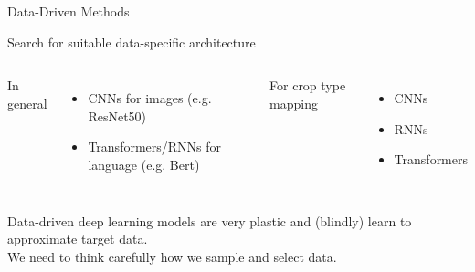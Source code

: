 \documentclass[11pt]{beamer}
\begin{document}
	\begin{frame}[t]{Data-Driven Methods}
		\centering
		\featurelearningtikz
		
		\hspace{-1em} Search for suitable data-specific architecture
			
			\begin{columns}[t]
				
				
				In general
					\begin{itemize}
						\item CNNs for images (e.g. ResNet50)
						\item Transformers/RNNs for language (e.g. Bert)
					\end{itemize}
				
				For crop type mapping
				\begin{itemize}
					\item CNNs 
					\item RNNs 
					\item Transformers
				\end{itemize}
			\end{columns}
		
		\vspace{2em}
			\centering
			{Data-driven deep learning models are very plastic and (blindly) learn to approximate target data.}\\
			
			\vspace{1em}
			We need to think carefully how we sample and select data. 
			
	\end{frame}
\end{document}
